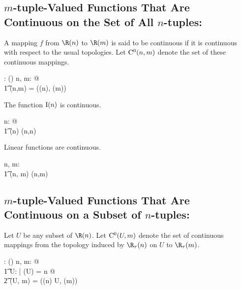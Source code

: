 \documentclass{amsart}
\begin{document}
\subsection{$m$-tuple-Valued Functions That Are Continuous on the Set of All $n$-tuples: }

A mapping $f$ from $\Rtup(n)$ to $\Rtup(m)$ is said to be continuous if it is continuous with respect to the usual topologies.
Let $\operatorname{C^0}(n,m)$ denote the set of these continuous mappings.

\begin{axdef}
	\CzeroRtupRtup: \nat \cross \nat \fun \power(\Rinf \pfun \Rinf)
\where
	\forall n, m: \nat @ \\
	\t1	\CzeroRtupRtup(n,m) = \CzeroTT(\tsRtup(n), \tsRtup(m))
\end{axdef}

\begin{example}
The function $\operatorname{I}(n)$ is continuous.

\begin{zed}
	\forall n: \nat @ \\
	\t1	\idRtup(n) \in \CzeroRtupRtup(n,n)
\end{zed}

\begin{theorem}
Linear functions are continuous.

\begin{zed}
	\forall n, m: \nat@ \\
	\t1	\linRtup(n, m) \subseteq \CzeroRtupRtup(n,m)
\end{zed}

\end{theorem}

\end{example}

\subsection{$m$-tuple-Valued Functions That Are Continuous on a Subset of $n$-tuples: }

Let $U$ be any subset of $\Rtup(n)$.
Let $\operatorname{C^0}(U,m)$ denote the set of continuous mappings from the topology induced by $\tsRtup(n)$ on $U$ to $\tsRtup(m)$.

\begin{axdef}
	\CzeroSubsetRtupRtup: \DeltaRinf \cross \nat \fun \power (\Rinf \pfun \Rinf)
\where
	\forall n, m: \nat @ \\
	\t1	\forall U: \DeltaRinf | \dimRinf(U) = n @ \\
	\t2		\CzeroSubsetRtupRtup(U, m) = \CzeroTT(\tsRtup(n) \inducedTopSp U, \tsRtup(m))
\end{axdef}
\end{document}

